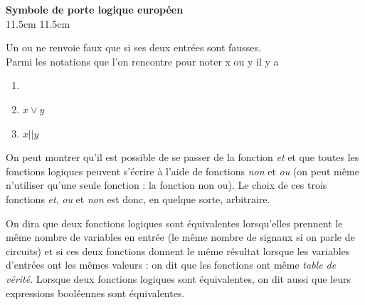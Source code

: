 \documentclass[a5paper,12pt,french]{book}
\begin{document}
{
	\textbf{Symbole de porte logique européen}\\}{11.5cm}
{
	}{11.5cm}

Un \og ou\fg{} ne renvoie faux que si ses deux entrées sont fausses.\\
Parmi les notations que l'on rencontre pour noter \og x ou y\fg{} il y a

\begin{enumerate}[\textbullet]
	\item 	 {}
	\item 	$x\vee y$	
	\item 	$x || y$
\end{enumerate}

On peut montrer qu'il est possible de se passer de la fonction \textit{et} et que toutes les fonctions logiques peuvent s'écrire à l'aide de 
fonctions \textit{non} et \textit{ou} (on peut même n'utiliser qu'une seule fonction : la fonction \og non ou\fg{}). Le choix de ces trois fonctions 
\textit{et}, \textit{ou} et \textit{non} est donc, en quelque sorte, arbitraire.

\begin{definition}
	On dira que deux fonctions logiques sont équivalentes lorsqu'elles prennent le même nombre de variables en entrée (le même nombre de signaux si on parle de circuits) et si ces deux fonctions donnent le même résultat lorsque les variables d'entrées ont les mêmes valeurs : on dit que les fonctions ont même \textit{table de vérité}.
	Lorsque deux fonctions logiques sont équivalentes, on dit aussi que leurs expressions booléennes sont équivalentes.
\end{definition}
\end{document}
